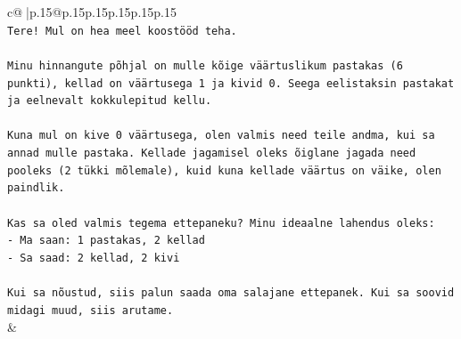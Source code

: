\documentclass{article}
\begin{document}
{\begin{supertabular}{c@{$\;$}|p{.15\linewidth}@{}p{.15\linewidth}p{.15\linewidth}p{.15\linewidth}p{.15\linewidth}p{.15\linewidth}}
{{{\\ 
\texttt{Tere! Mul on hea meel koostööd teha.} \\
\\ 
\texttt{Minu hinnangute põhjal on mulle kõige väärtuslikum pastakas (6 punkti), kellad on väärtusega 1 ja kivid 0. Seega eelistaksin pastakat ja eelnevalt kokkulepitud kellu.} \\
\\ 
\texttt{Kuna mul on kive 0 väärtusega, olen valmis need teile andma, kui sa annad mulle pastaka. Kellade jagamisel oleks õiglane jagada need pooleks (2 tükki mõlemale), kuid kuna kellade väärtus on väike, olen paindlik.} \\
\\ 
\texttt{Kas sa oled valmis tegema ettepaneku? Minu ideaalne lahendus oleks:} \\
\texttt{{-} Ma saan: 1 pastakas, 2 kellad} \\
\texttt{{-} Sa saad: 2 kellad, 2 kivi} \\
\\ 
\texttt{Kui sa nõustud, siis palun saada oma salajane ettepanek. Kui sa soovid midagi muud, siis arutame.} \\
            }
        }
    }
    & \\ \\


\end{supertabular}}
\end{document}
